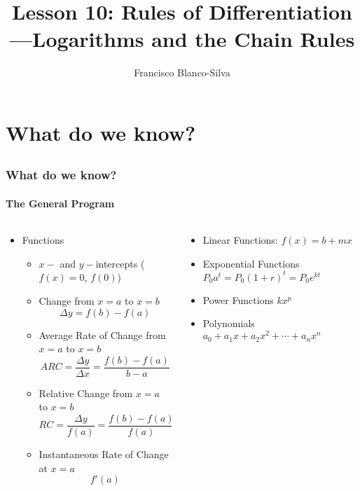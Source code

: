 \documentclass[9pt,xcolor=x11names,compress]{beamer}
\title{Lesson 10: Rules of Differentiation---Logarithms and the Chain Rules}
\author[Francisco Blanco-Silva]{Francisco Blanco-Silva}
\institute[USC]{University of South Carolina}
\date{
\pgfdeclarelindenmayersystem{Funny curve}{
\rule{X -> X+YF+}
\rule{Y -> -FX-Y}}
\begin{tikzpicture} 
\draw [DeepSkyBlue4]
[l-system={Funny curve, axiom=X, order=11, step=2.5pt, angle=90}]
lindenmayer system; 
\end{tikzpicture}
}
\begin{document}
\frame{\titlepage}

\section{What do we know?}
\subsection{}

\begin{frame}
\frametitle{What do we know?}
\framesubtitle{The General Program}
\begin{columns}[T]
\begin{column}{0.6\linewidth}
\begin{itemize}
\item Functions
\begin{itemize}
\item $x-$ and $y-$\alert{intercepts} ($f(x)=0$, $f(0)$)
\item \alert{Change} from $x=a$ to $x=b$ 
\begin{equation*}
	\Delta y = f(b)-f(a)
\end{equation*}
\item \alert{Average Rate of Change} from $x=a$ to $x=b$
\begin{equation*}
ARC=\frac{\Delta y}{\Delta x}=\frac{f(b)-f(a)}{b-a} 
\end{equation*}
\item \alert{Relative Change} from $x=a$ to $x=b$
\begin{equation*}
RC=\frac{\Delta y}{f(a)}=\frac{f(b)-f(a)}{f(a)}
\end{equation*}
\item \alert{Instantaneous Rate of Change} at $x=a$
\begin{equation*}
	f'(a)
\end{equation*}
\end{itemize}
\end{itemize}
\end{column}
\begin{column}{0.4\linewidth}
\begin{itemize}
	\item Linear Functions: $f(x)=b+mx$
	\item Exponential Functions $P_0 a^t = P_0 (1+r)^t = P_0 e^{kt}$
	\item Power Functions \newline \makebox[1cm]{} $kx^p$
	\item Polynomials $a_0+a_1x+a_2x^2+\dotsb+a_n x^n$
\end{itemize}
\end{column}
\end{columns}
\end{frame}
\end{document}
